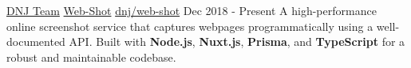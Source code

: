
\begin{cventries}
	\begin{cventries}
		\cventry
			{\href{https://dnj.co.ir}{DNJ Team}} %
			{\href{https://web-shot.ir}{\acvHeaderIconSep Web-Shot}} %
			{\href{https://github.com/dnj/web-shot}{\faGithubSquare\acvHeaderIconSep dnj/web-shot}} %
			{Dec 2018 - Present} %
			{A high-performance online screenshot service that captures webpages programmatically using a well-documented API. Built with \textbf{Node.js}, \textbf{Nuxt.js}, \textbf{Prisma}, and \textbf{TypeScript} for a robust and maintainable codebase.}
	
	\end{cventries}
\end{cventries}

